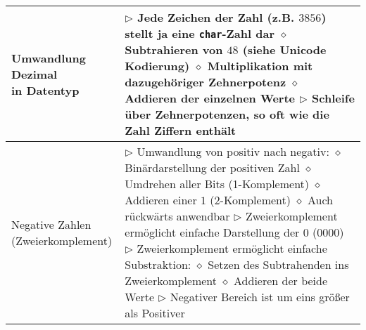 \begin{longtable}{ | p{} p{} | }
	\makecell[l]{Umwandlung Dezimal \\ in Datentyp} & \makecell[l]{
	$\triangleright$ Jede Zeichen der Zahl (z.B. $3856$) stellt ja eine \texttt{char}-Zahl dar \\
	\hspace{0.4cm} $\diamond$ Subtrahieren von $48$ (siehe Unicode Kodierung) \\
	\hspace{0.4cm} $\diamond$ Multiplikation mit dazugehöriger Zehnerpotenz \\
	\hspace{0.4cm} $\diamond$ Addieren der einzelnen Werte \\
	$\triangleright$ Schleife über Zehnerpotenzen, so oft wie die Zahl Ziffern enthält} \\ \hline

	\makecell[l]{Negative Zahlen \\ (Zweierkomplement)} & \makecell[l]{
	$\triangleright$ Umwandlung von positiv nach negativ: \\
	\hspace{0.4cm} $\diamond$ Binärdarstellung der positiven Zahl \\
	\hspace{0.4cm} $\diamond$ Umdrehen aller Bits (1-Komplement) \\
	\hspace{0.4cm} $\diamond$ Addieren einer $1$ (2-Komplement) \\
	\hspace{0.4cm} $\diamond$ Auch rückwärts anwendbar \\
	$\triangleright$ Zweierkomplement ermöglicht einfache Darstellung der $0$ ($0000$) \\
	$\triangleright$ Zweierkomplement ermöglicht einfache Substraktion: \\
	\hspace{0.4cm} $\diamond$ Setzen des Subtrahenden ins Zweierkomplement \\
	\hspace{0.4cm} $\diamond$ Addieren der beide Werte \\
	$\triangleright$ Negativer Bereich ist um eins grö\ss er als Positiver} \\ \hline


\end{longtable}
